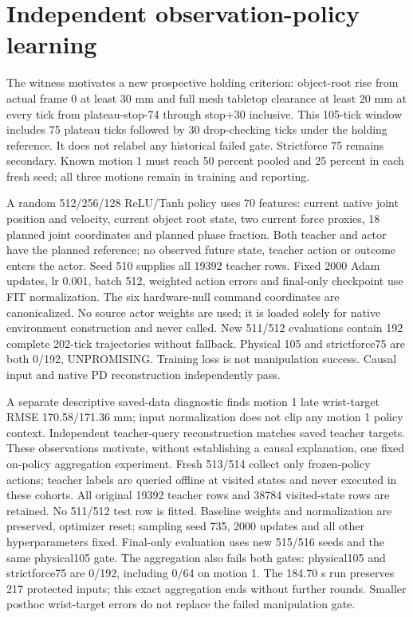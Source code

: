 \documentclass[10pt]{article}
\begin{document}
\section{Independent observation-policy learning}
The witness motivates a new prospective holding criterion: object-root rise from
actual frame 0 at least 30 mm and full mesh tabletop clearance at least 20 mm at every
tick from plateau-stop-74 through stop+30 inclusive. This 105-tick window includes
75 plateau ticks followed by 30 drop-checking ticks under the holding reference.
It does not relabel any historical failed gate. Strictforce 75 remains secondary.
Known motion 1 must reach 50 percent pooled and 25 percent in each fresh seed;
all three motions remain in training and reporting.

A random 512/256/128 ReLU/Tanh policy uses 70 features: current native joint position
and velocity, current object root state, two current force proxies, 18 planned joint
coordinates and planned phase fraction. Both teacher and actor have the planned
reference; no observed future state, teacher action or outcome enters the actor.
Seed 510 supplies all 19392 teacher rows. Fixed 2000 Adam updates, lr 0.001, batch 512,
weighted action errors and final-only checkpoint use FIT normalization. The six
hardware-null command coordinates are canonicalized. No source actor weights are
used; it is loaded solely for native environment construction and never called.
New 511/512 evaluations contain 192 complete 202-tick trajectories without fallback.
Physical 105 and strictforce75 are both 0/192, UNPROMISING. Training loss is not
manipulation success. Causal input and native PD reconstruction independently pass.

A separate descriptive saved-data diagnostic finds motion 1 late wrist-target
RMSE 170.58/171.36 mm; input normalization does not clip any motion 1 policy context.
Independent teacher-query reconstruction matches saved teacher targets. These
observations motivate, without establishing a causal explanation, one fixed
on-policy aggregation experiment. Fresh 513/514 collect only frozen-policy actions;
teacher labels are queried offline at visited states and never executed in these
cohorts. All original 19392 teacher rows and 38784 visited-state rows are retained.
No 511/512 test row is fitted. Baseline weights and normalization are preserved,
optimizer reset; sampling seed 735, 2000 updates and all other hyperparameters fixed.
Final-only evaluation uses new 515/516 seeds and the same physical105 gate.
The aggregation also fails both gates: physical105 and strictforce75 are 0/192,
including 0/64 on motion 1. The 184.70 s run preserves 217 protected inputs; this exact
aggregation ends without further rounds. Smaller posthoc wrist-target errors
do not replace the failed manipulation gate.
\end{document}
